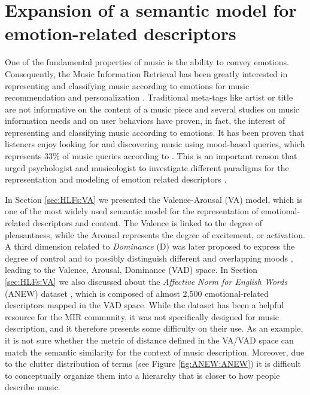 \chapter{Expansion of a semantic model for emotion-related descriptors}
\label{Chap:ANEW}
One of the fundamental properties of music is the ability to convey emotions\cite{Yang2012}. Consequently, the Music Information Retrieval has been greatly interested in representing and classifying music according to emotions for music recommendation and personalization \cite{Juslin:2001, Juslin2011, Lee2004, Yang2012}. Traditional meta-tags like artist or title are not informative on the content of a music piece and several studies \cite{Juslin:2001, Juslin2011, Lee2004, Yang2012} on music information needs and on user behaviors have proven, in fact, the interest of representing and classifying music according to emotions.
It has been proven that listeners enjoy looking for and discovering music using mood-based queries, which represents 33\% of music queries according to \cite{Lee2004}. This is an important reason that urged psychologist and musicologist to investigate different paradigms for the representation and modeling of emotion related descriptors \cite{Juslin:2001, Juslin2011, Lee2004}. 

In Section \ref{sec:HLFs:VA} we presented the Valence-Arousal (VA) model, which is one of the most widely used semantic model for the representation of emotional-related descriptors and content. The Valence is linked to the degree of pleasantness, while the Arousal represents the degree of excitement, or activation. A third dimension related to \textit{Dominance} (D) was later proposed to express the degree of control and to possibly distinguish different and overlapping moods \cite{Cowie2012, Scherer2004}, leading to the Valence, Arousal, Dominance (VAD) space. In Section \ref{sec:HLFs:VA} we also discussed about the \textit{Affective Norm for English Words} (ANEW) dataset \cite{Bradley1999}, which is composed of almost 2,500 emotional-related descriptors mapped in the VAD space. While the dataset has been a helpful resource for the MIR community, it was not specifically designed for music description, and it therefore presents some difficulty on their use. As an example, it is not sure whether the metric of distance defined in the VA/VAD space can match the semantic similarity for the context of music description. Moreover, due to the clutter distribution of terms (see Figure \ref{fig:ANEW:ANEW}) it is difficult to conceptually organize them into a  hierarchy that is closer to how people describe music.

